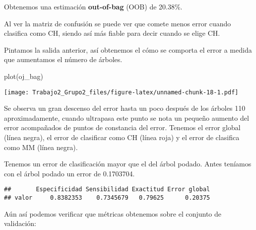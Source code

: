 \documentclass[
]{article}
\newenvironment{Shaded}{\begin{snugshade}}{\end{snugshade}}
\newcommand{\AttributeTok}[1]{\textcolor[rgb]{0.77,0.63,0.00}{#1}}
\newcommand{\DecValTok}[1]{\textcolor[rgb]{0.00,0.00,0.81}{#1}}
\newcommand{\FunctionTok}[1]{\textcolor[rgb]{0.00,0.00,0.00}{#1}}
\newcommand{\NormalTok}[1]{#1}
\newcommand{\OtherTok}[1]{\textcolor[rgb]{0.56,0.35,0.01}{#1}}
\newcommand{\SpecialCharTok}[1]{\textcolor[rgb]{0.00,0.00,0.00}{#1}}
\begin{document}
Obtenemos una estimación \textbf{out-of-bag} (OOB) de 20.38\%.

Al ver la matriz de confusión se puede ver que comete menos error cuando
clasifica como CH, siendo así más fiable para decir cuando se elige CH.

Pintamos la salida anterior, así obtenemos el cómo se comporta el error
a medida que aumentamos el número de árboles.

\begin{Shaded}
\begin{Highlighting}[]
\FunctionTok{plot}\NormalTok{(oj\_bag)}
\end{Highlighting}
\end{Shaded}

\texttt{[image: Trabajo2\_Grupo2\_files/figure-latex/unnamed-chunk-18-1.pdf]}

Se observa un gran descenso del error hasta un poco después de los
árboles 110 aproximadamente, cuando ultrapasa este punto se nota un
pequeño aumento del error acompañados de puntos de constancia del error.
Tenemos el error global (línea negra), el error de clasificar como CH
(línea roja) y el error de clasifica como MM (línea negra).

Tenemos un error de clasificación mayor que el del árbol podado. Antes
teníamos con el árbol podado un error de 0.1703704.

\begin{Shaded}
\end{Shaded}

\begin{verbatim}
##       Especificidad Sensibilidad Exactitud Error global
## valor     0.8382353    0.7345679   0.79625      0.20375
\end{verbatim}

Aún así podemos verificar que métricas obtenemos sobre el conjunto de
validación:

\begin{Shaded}
\end{Shaded}
\end{document}
